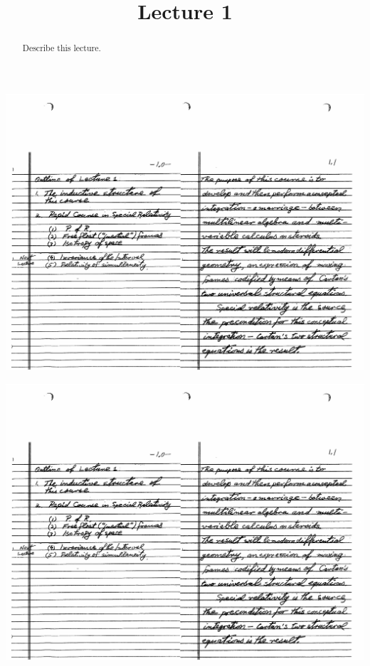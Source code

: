 \documentclass{ximera}
\title{Lecture 1}
\begin{document}
\begin{abstract}
Describe this lecture.
\end{abstract}
\maketitle

\begin{image}
\includegraphics{lecture01-01.pdf}
\end{image}

\begin{image}
\includegraphics{lecture01-02.pdf}
\end{image}
\end{document}
